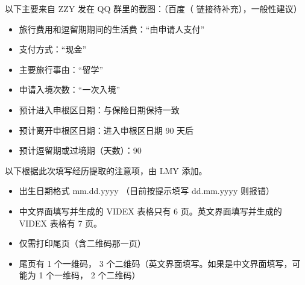 \documentclass[oneside,final]{book}
\begin{document}
以下主要来自 ZZY 发在 QQ 群里的截图：（百度（%
链接待补充），一般性建议）
\begin{itemize}
\item 旅行费用和逗留期期间的生活费：“由申请人支付”
\item 支付方式：“现金”
\item 主要旅行事由：“留学”
\item 申请入境次数：“一次入境”
\item 预计进入申根区日期：与保险日期保持一致
\item 预计离开申根区日期：进入申根区日期 90 天后
\item 预计逗留期或过境期（天数）：90
\end{itemize}
以下根据此次填写经历提取的注意项，由 LMY 添加。
\begin{itemize}
  \item 出生日期格式 mm.dd.yyyy （目前按提示填写 dd.mm.yyyy 则报错）
  \item 中文界面填写并生成的 VIDEX 表格只有 6 页。英文界面填写并生成的 VIDEX 表格有 7 页。
  \item 仅需打印尾页（含二维码那一页）
  \item 尾页有 1 个一维码， 3 个二维码（英文界面填写。如果是中文界面填写，可能为 1 个一维码， 2 个二维码）
\end{itemize}
\end{document}
